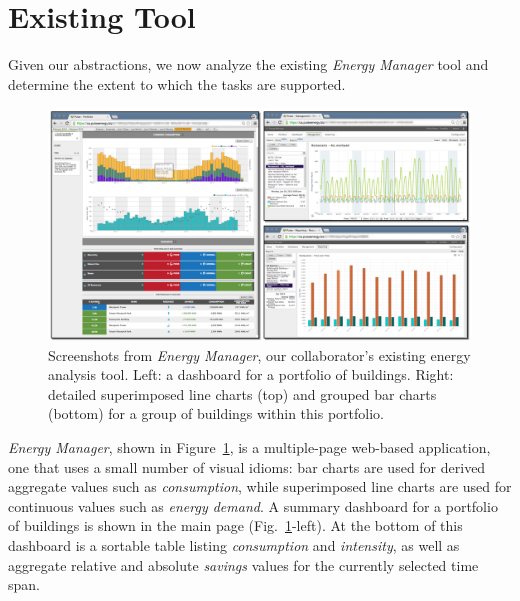\documentclass[journal]{vgtc}                %
\begin{document}

\section{Existing Tool}
\label{existing-tool}


Given our abstractions, we now analyze the existing {\it Energy Manager} tool and determine the extent to which the tasks are supported.

\begin{figure}[bp!]
    \vspace{-0.6cm}
	\centering
	\includegraphics[width=\textwidth]{figures/em.pdf}
	\vspace{-0.6cm}
	\caption{Screenshots from \textsl{Energy Manager}, our collaborator's existing energy analysis tool. Left: a dashboard for a portfolio of buildings. Right: detailed superimposed line charts (top) and grouped bar charts (bottom) for a group of buildings within this portfolio.}
	\label{fig:energy-manager}
\end{figure} 


{\it Energy Manager}, shown in Figure~\ref{fig:energy-manager}, is a multiple-page web-based application, one that uses a small number of visual idioms: bar charts are used for derived aggregate values such as {\it consumption}, while superimposed line charts are used for continuous values such as {\it energy demand}.
A summary dashboard for a portfolio of buildings is shown in the main page (Fig.~\ref{fig:energy-manager}-left). 
At the bottom of this dashboard is a sortable table listing {\it consumption} and {\it intensity}, as well as aggregate relative and absolute {\it savings} values for the currently selected time span. 
\end{document}
